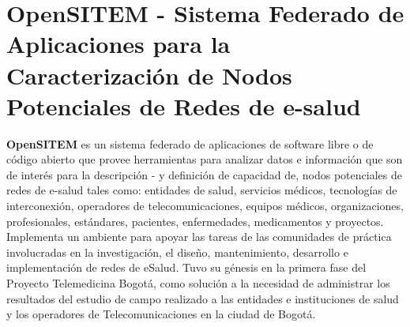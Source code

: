 \chapter{OpenSITEM - Sistema Federado de Aplicaciones para la Caracterización de Nodos Potenciales de Redes de e-salud}

\textbf{OpenSITEM }es un sistema federado de aplicaciones de software libre o de código abierto que provee herramientas para analizar datos e información que son de interés para la descripción - y definición de capacidad de, nodos potenciales de redes de e-salud tales como: entidades de salud, servicios médicos, tecnologías de interconexión, operadores de telecomunicaciones, equipos médicos, organizaciones, profesionales, estándares, pacientes, enfermedades, medicamentos y proyectos. Implementa un ambiente para apoyar las tareas de las comunidades de práctica involucradas en la investigación, el diseño, mantenimiento, desarrollo e implementación de redes de eSalud. Tuvo su génesis en la primera fase del Proyecto Telemedicina Bogotá, como solución a la necesidad de administrar los resultados del estudio de campo realizado a las entidades e instituciones de salud y los operadores de Telecomunicaciones en la ciudad de Bogotá.

